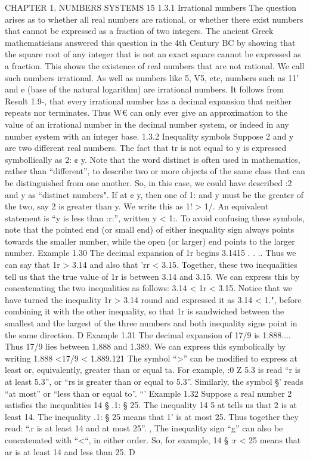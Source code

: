 CHAPTER 1. NUMBERS SYSTEMS 15
1.3.1 Irrational numbers
The question arises as to whether all real numbers are rational, or whether there exist numbers that
cannot be expressed as a fraction of two integers. The ancient Greek mathematicians answered
this question in the 4th Century BC by showing that the square root of any integer that is not
an exact square cannot be expressed as a fraction. This shows the existence of real numbers that
are not rational. We call such numbers irrational. As well as numbers like \/5, V5, etc, numbers
such as 11' and e (base of the natural logarithm) are irrational numbers. It follows from Result 1.9-,
that every irrational number has a decimal expansion that neither repeats nor terminates. Thus
W€ can only ever give an approximation to the value of an irrational number in the decimal number
system, or indeed in any number system with an integer base.
1.3.2 Inequality symbols
Suppose 2 and y are two different real numbers. The fact that tr is not equal to y is expressed
symbollically as
2: ¢ y.
Note that the word distinct is often used in mathematics, rather than “different”, to describe two
or more objects of the same class that can be distinguished from one another. So, in this case, we
could have described :2 and y as “distinct numbers".
If at ¢ y, then one of 1: and y must be the greater of the two, say 2 is greater than y. We write
this as
1! > 1/.
An equivalent statement is “y is less than :r:”, written
y < 1:.
To avoid confusing these symbols, note that the pointed end (or small end) of either inequality
sign always points towards the smaller number, while the open (or larger) end points to the larger
number.
Example 1.30 The decimal expansion of 1r begins 3.1415 . . .. Thus we can say that 1r > 3.14 and
also that 'rr < 3.15. Together, these two inequalities tell us that the true value of 1r is between 3.14
and 3.15. We can express this by concatenating the two inequalities as follows:
3.14 < 1r < 3.15.
Notice that we have turned the inequality 1r > 3.14 round and expressed it as 3.14 < 1.", before
combining it with the other inequality, so that 1r is sandwiched between the smallest and the largest
of the three numbers and both inequality signs point in the same direction. D
Example 1.31 The decimal expansion of 17/9 is 1.888.... Thus 17/9 lies between 1.888 and
1.389. We can express this symbolically by writing
1.888 <17/9 < 1.889.121
The symbol “>” can be modiﬁed to express at least or, equivalently, greater than or equal ta. For
example,
:0 Z 5.3
is read “r is at least 5.3”, or “rs is greater than or equal to 5.3”. Similarly, the symbol §’ reads
“at most” or “less than or equal to”. “'
Example 1.32 Suppose a real number 2 satisﬁes the inequalities 14 § .1: § 25. The inequality
14 5 at tells us that 2 is at least 14. The inequality .1: § 25 means that 1' is at most 25. Thus
together they read: “.r is at least 14 and at most 25”. ,
The inequality sign “g” can also be concatenated with “<“, in either order. So, for example,
14 § :r < 25 means that ar is at least 14 and less than 25. D



